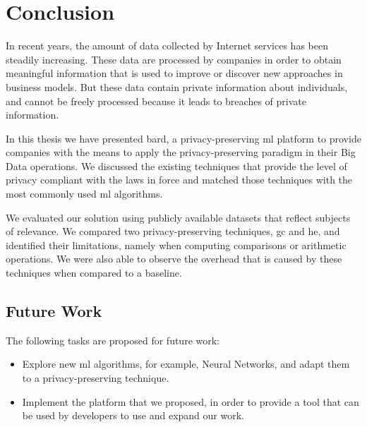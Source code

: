 %

\acresetall

\chapter{Conclusion}
\label{ch:ConclusionsAndFutureWork}


In recent years, the amount of data collected by Internet services has been steadily increasing. These data are processed by companies in order to obtain meaningful information that is used to improve or discover new approaches in business models. But these data contain private information about individuals, and cannot be freely processed because it leads to breaches of private information.

In this thesis we have presented \acs{bard}, a privacy-preserving \ac{ml} platform to provide companies with the means to apply the privacy-preserving paradigm in their Big Data operations. We discussed the existing techniques that provide the level of privacy compliant with the laws in force and matched those techniques with the most commonly used \ac{ml} algorithms.

We evaluated our solution using publicly available datasets that reflect subjects of relevance. We compared two privacy-preserving techniques, \ac{gc} and \ac{he}, and identified their limitations, namely when computing comparisons or arithmetic operations. We were also able to observe the overhead that is caused by these techniques when compared to a baseline.



\section{Future Work}
\label{sec:FutureWork}


The following tasks are proposed for future work:

\begin{itemize}
	\item Explore new \ac{ml} algorithms, for example, Neural Networks, and adapt them to a privacy-preserving technique.
	\item Implement the platform that we proposed, in order to provide a tool that can be used by developers to use and expand our work.
\end{itemize}


